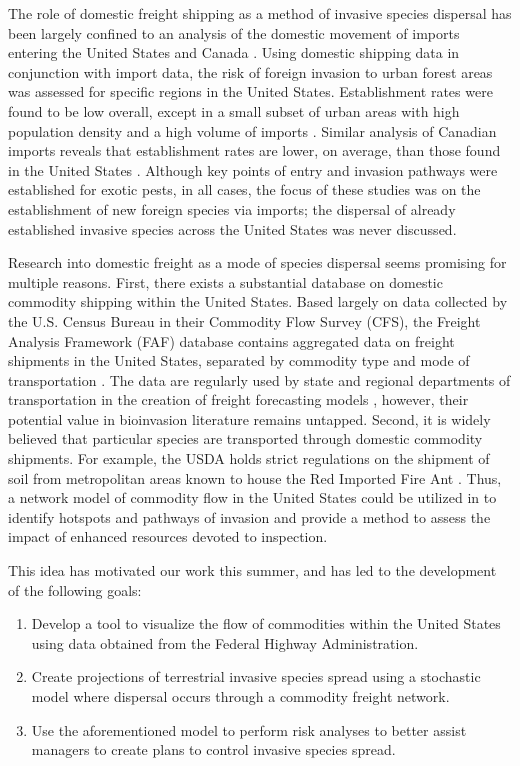 \documentclass[12pt]{article}
\begin{document}
The role of domestic freight shipping as a method of invasive species dispersal has been largely confined to an analysis of the domestic movement of imports entering the United States and Canada \citep{Koch2011, Colunga2009, Yemshanov2013}.  Using domestic shipping data in conjunction with import data, the risk of foreign invasion to urban forest areas was assessed for specific regions in the United States.  Establishment rates were found to be low overall, except in a small subset of urban areas with high population density and a high volume of imports \citep{Colunga2009, Koch2011}.  Similar analysis of Canadian imports reveals that establishment rates are lower, on average, than those found in the United States \citep{Yemshanov2013}.  Although key points of entry and invasion pathways were established for exotic pests, in all cases, the focus of these studies was on the establishment of new foreign species via imports; the dispersal of already established invasive species across the United States was never discussed.  

Research into domestic freight as a mode of species dispersal seems promising for multiple reasons.  First, there exists a substantial database on domestic commodity shipping within the United States.  Based largely on data collected by the U.S. Census Bureau in their Commodity Flow Survey (CFS), the Freight Analysis Framework (FAF) database contains aggregated data on freight shipments in the United States, separated by commodity type and mode of transportation \citep{FAF3manual, FAFwebsite}.  The data are regularly used by state and regional departments of transportation in the creation of freight forecasting models \citep{NCHRP, Chow2010, Sivakumar2002}, however, their potential value in bioinvasion literature remains untapped.  Second, it is widely believed that particular species are transported through domestic commodity shipments. For example, the USDA holds strict regulations on the shipment of soil from metropolitan areas known to house the Red Imported Fire Ant \citep{USDA}.  Thus, a network model of commodity flow in the United States could be utilized in to identify hotspots and pathways of invasion and provide a method to assess the impact of enhanced resources devoted to inspection. 

This idea has motivated our work this summer, and has led to the development of the following goals:

\begin{enumerate}

\item Develop a tool to visualize the flow of commodities within the United States using data obtained from the Federal Highway Administration.

\item Create projections of terrestrial invasive species spread using a stochastic model where dispersal occurs through a commodity freight network.

\item Use the aforementioned model to perform risk analyses to better assist managers to create plans to control invasive species spread.

\end{enumerate}
\end{document}
